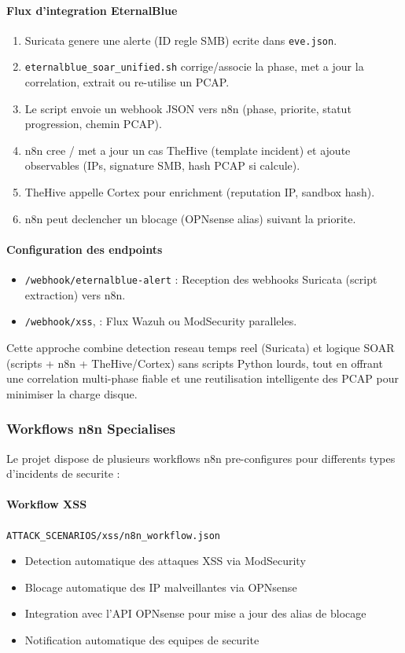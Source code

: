 \paragraph{Flux d'integration EternalBlue}
\begin{enumerate}
    \item Suricata genere une alerte (ID regle SMB) ecrite dans \texttt{eve.json}.
    \item \texttt{eternalblue\_soar\_unified.sh} corrige/associe la phase, met a jour la correlation, extrait ou re-utilise un PCAP.
    \item Le script envoie un webhook JSON vers n8n (phase, priorite, statut progression, chemin PCAP).
    \item n8n cree / met a jour un cas TheHive (template incident) et ajoute observables (IPs, signature SMB, hash PCAP si calcule).
    \item TheHive appelle Cortex pour enrichment (reputation IP, sandbox hash).
    \item n8n peut declencher un blocage (OPNsense alias) suivant la priorite.
\end{enumerate}

\paragraph{Configuration des endpoints}
\begin{itemize}
    \item \texttt{/webhook/eternalblue-alert} : Reception des webhooks Suricata (script extraction) vers n8n.
    \item \texttt{/webhook/xss}, : Flux Wazuh ou ModSecurity paralleles.
\end{itemize}

Cette approche combine detection reseau temps reel (Suricata) et logique SOAR (scripts + n8n + TheHive/Cortex) sans scripts Python lourds, tout en offrant une correlation multi-phase fiable et une reutilisation intelligente des PCAP pour minimiser la charge disque.

\subsubsection{Workflows n8n Specialises}

Le projet dispose de plusieurs workflows n8n pre-configures pour differents types d'incidents de securite :

\paragraph{Workflow XSS}
\texttt{ATTACK\_SCENARIOS/xss/n8n\_workflow.json}
\begin{itemize}
    \item Detection automatique des attaques XSS via ModSecurity
    \item Blocage automatique des IP malveillantes via OPNsense
    \item Integration avec l'API OPNsense pour mise a jour des alias de blocage
    \item Notification automatique des equipes de securite
\end{itemize}

